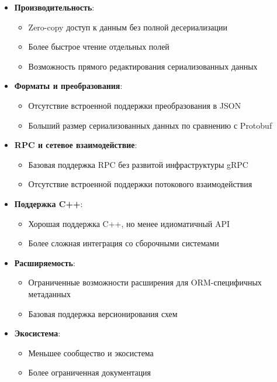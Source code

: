             \begin{itemize}
                \item \textbf{Производительность}:
                \begin{itemize}
                    \item Zero-copy доступ к данным без полной десериализации
                    \item Более быстрое чтение отдельных полей
                    \item Возможность прямого редактирования сериализованных данных
                \end{itemize}

                \item \textbf{Форматы и преобразования}:
                \begin{itemize}
                    \item Отсутствие встроенной поддержки преобразования в JSON
                    \item Больший размер сериализованных данных по сравнению с Protobuf
                \end{itemize}

                \item \textbf{RPC и сетевое взаимодействие}:
                \begin{itemize}
                    \item Базовая поддержка RPC без развитой инфраструктуры gRPC
                    \item Отсутствие встроенной поддержки потокового взаимодействия
                \end{itemize}

                \item \textbf{Поддержка C++}:
                \begin{itemize}
                    \item Хорошая поддержка C++, но менее идиоматичный API
                    \item Более сложная интеграция со сборочными системами
                \end{itemize}

                \item \textbf{Расширяемость}:
                \begin{itemize}
                    \item Ограниченные возможности расширения для ORM-специфичных метаданных
                    \item Базовая поддержка версионирования схем
                \end{itemize}

                \item \textbf{Экосистема}:
                \begin{itemize}
                    \item Меньшее сообщество и экосистема
                    \item Более ограниченная документация
                \end{itemize}
            \end{itemize}

